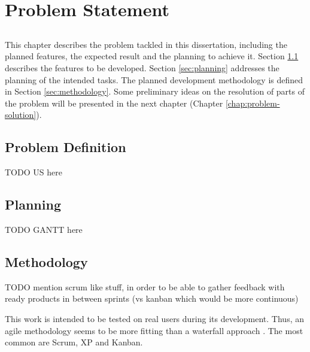 \chapter{Problem Statement}\label{chap:problem}

\section*{}

This chapter describes the problem tackled in this dissertation, including the planned features, the expected result and the planning to achieve it. Section \ref{sec:prob-def} describes the features to be developed. Section \ref{sec:planning} addresses the planning of the intended tasks. The planned development methodology is defined in Section \ref{sec:methodology}. Some preliminary ideas on the resolution of parts of the problem will be presented in the next chapter (Chapter \ref{chap:problem-solution}). 

\section{Problem Definition}\label{sec:prob-def}

TODO
US here

\section{Planning}\label{sec:prob-planning}

TODO
GANTT here

\section{Methodology}\label{sec:prob-methodology}

TODO
mention scrum like stuff, in order to be able to gather feedback with ready products in between sprints (vs kanban which would be more continuous)


This work is intended to be tested on real users during its development. Thus, an agile methodology seems to be more fitting than a waterfall approach \cite{beck2001agile}. The most common are Scrum, XP and Kanban.

